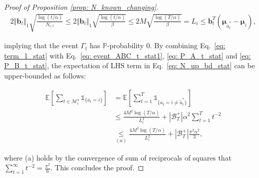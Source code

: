 \begin{proof}[Proof of Proposition \ref{prop: N_known_changing}]
\begin{equation}
\begin{aligned}
2 \Vert \boldsymbol{b}_t \Vert_1 \sqrt{\frac{ \log(t/\alpha)}{N_{i,t}}}
\leq
2 \Vert \boldsymbol{b}_t \Vert_1 \sqrt{\frac{ \log(t/\alpha)}{\beta}}
\leq
2 M \sqrt{\frac{ \log(T/\alpha)}{\beta}} = L_i 
\leq 
\boldsymbol{b}_t^T (\boldsymbol{\mu}_{\tilde{a}^{*}_{t}} - \boldsymbol{\mu}_{i}), 
\end{aligned}
\end{equation}

implying that the event $\Gamma_t$ has $\mathbb{P}$-probability 0.
By combining Eq.~\ref{eq: term_1_stat} with Eq.~\ref{eq: event_ABC_t_stat1}, \ref{eq: P_A_t_stat} and \ref{eq: P_B_t_stat}, the expectation of LHS term in Eq.~\ref{eq: N_up_bd_stat} can be upper-bounded as follows:

\begin{equation}
\begin{aligned}
\label{eq: upbd_term_1_stat}
\mathbb{E} \left[\sum_{t \in \mathcal{M}^{o}_i} \mathds{1}_{\{a_t = i \} } \right]
& = 
\mathbb{E} \left[ \sum_{t=1}^{T} \mathds{1}_{\{a_t = i \neq \tilde{a}^{*}_{t} \}} \right] \\
& \leq 
\frac{4 M^2 \log (T/\alpha)}{L_i^2}
+
|\mathcal{B}^{+}_{T}| \alpha^2 \sum_{t=1}^{T} t^{-2}  \\
& \underset{(a)}{\leq}
\frac{4 M^2 \log (T/\alpha)}{L_i^2}
+
|\mathcal{B}^{+}_{T}| \frac{\pi^2 \alpha^2}{3},
\end{aligned}
\end{equation}

where (a) holds by the convergence of sum of reciprocals of squares that 
$\sum_{t=1}^{\infty} t^{-2} = \frac{\pi^2}{6}$. This concludes the proof.

\end{proof}

